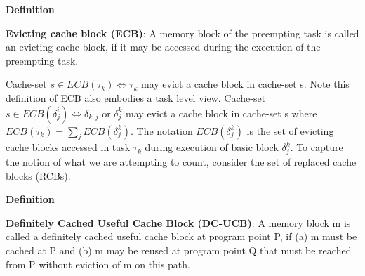 \textbf{Definition~\cite{altmeyer:11c}}

\textbf{Evicting cache block (ECB)}: A memory block of the preempting task is called an evicting cache block, if it may be accessed during the execution of the preempting task.

Cache-set \begin{math}s \in ECB(\tau_{k}) \Leftrightarrow \tau_{k}\end{math} may evict a cache block in cache-set s.  Note this definition of ECB also embodies a task level view.  Cache-set \begin{math}s \in ECB(\delta_{j}^{i}) \Leftrightarrow \delta_{k,j}\end{math} or \begin{math}\delta_{j}^{k}\end{math} may evict a cache block in cache-set s where \begin{math}ECB(\tau_{k}) = \sum_{j} ECB(\delta_{j}^{k})\end{math}. The notation \begin{math}ECB(\delta_{j}^{k})\end{math} is the set of evicting cache blocks accessed in task \begin{math}\tau_{k}\end{math} during execution of basic block \begin{math}\delta_{j}^{k}\end{math}.  To capture the notion of what we are attempting to count, consider the set of replaced cache blocks (RCBs).

\textbf{Definition~\cite{altmeyer:11c}}

\textbf{Definitely Cached Useful Cache Block (DC-UCB)}: A memory block m is called a definitely cached useful cache block at program point P, if (a) m must be cached at P and (b) m may be reused at program point Q that must be reached from P without eviction of m on this path.

